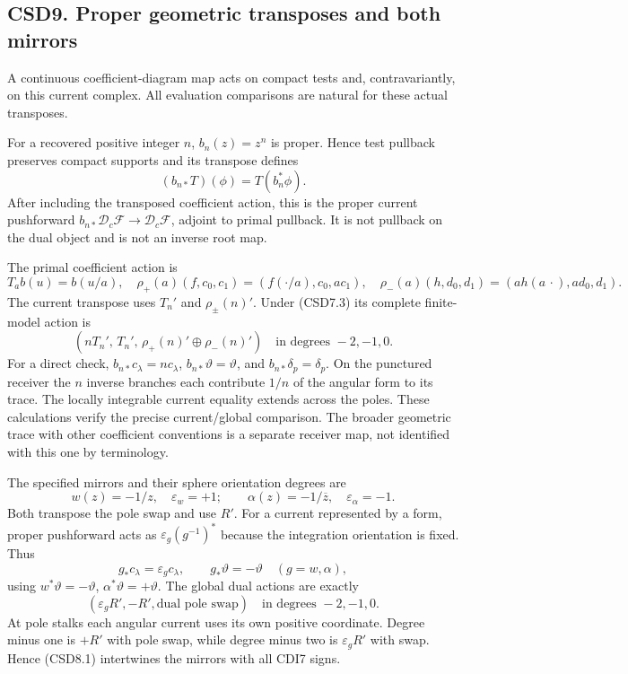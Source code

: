\subsection{CSD9. Proper geometric transposes and both
mirrors}\label{csd9.-proper-geometric-transposes-and-both-mirrors}

A continuous coefficient-diagram map acts on compact tests and,
contravariantly, on this current complex. All evaluation comparisons are
natural for these actual transposes.

For a recovered positive integer \(n\), \(b_n(z)=z^n\) is proper. Hence
test pullback preserves compact supports and its transpose defines \[
(b_{n*}T)(\phi)=T(b_n^*\phi).
\tag{CSD9.1}
\] After including the transposed coefficient action, this is the proper
current pushforward
\(b_{n*}\mathscr D_c\mathscr F\to\mathscr D_c\mathscr F\), adjoint to
primal pullback. It is not pullback on the dual object and is not an
inverse root map.

The primal coefficient action is \[
T_ab(u)=b(u/a),\quad
\rho_+(a)(f,c_0,c_1)=(f(\cdot/a),c_0,ac_1),\quad
\rho_-(a)(h,d_0,d_1)=(ah(a\,\cdot),ad_0,d_1).
\tag{CSD9.2}
\] The current transpose uses \(T_n'\) and \(\rho_\pm(n)'\). Under
(CSD7.3) its complete finite-model action is \[
(nT_n',\,T_n',\,\rho_+(n)'\oplus\rho_-(n)')
\quad\text{in degrees }-2,-1,0.
\tag{CSD9.3}
\] For a direct check, \(b_{n*}c_\lambda=nc_\lambda\),
\(b_{n*}\vartheta=\vartheta\), and \(b_{n*}\delta_p=\delta_p\). On the
punctured receiver the \(n\) inverse branches each contribute \(1/n\) of
the angular form to its trace. The locally integrable current equality
extends across the poles. These calculations verify the precise
current/global comparison. The broader geometric trace with other
coefficient conventions is a separate receiver map, not identified with
this one by terminology.

The specified mirrors and their sphere orientation degrees are \[
w(z)=-1/z,\quad\varepsilon_w=+1;\qquad
\alpha(z)=-1/\overline z,\quad\varepsilon_\alpha=-1.
\tag{CSD9.4}
\] Both transpose the pole swap and use \(R'\). For a current
represented by a form, proper pushforward acts as
\(\varepsilon_g(g^{-1})^*\) because the integration orientation is
fixed. Thus \[
g_*c_\lambda=\varepsilon_gc_\lambda,\qquad
g_*\vartheta=-\vartheta\quad(g=w,\alpha),
\tag{CSD9.5}
\] using \(w^*\vartheta=-\vartheta\), \(\alpha^*\vartheta=+\vartheta\).
The global dual actions are exactly \[
(\varepsilon_gR',-R',\text{dual pole swap})
\quad\text{in degrees }-2,-1,0.
\tag{CSD9.6}
\] At pole stalks each angular current uses its own positive coordinate.
Degree minus one is \(+R'\) with pole swap, while degree minus two is
\(\varepsilon_gR'\) with swap. Hence (CSD8.1) intertwines the mirrors
with all CDI7 signs.

